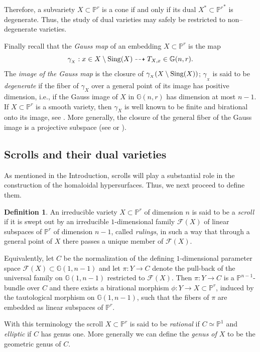 \documentclass[11pt]{article}   %
\theoremstyle{definition}
\newtheorem{Definition}[Theorem]{Definition}
\numberwithin{Theorem}{section} \numberwithin{equation}{section}
\newcommand{\G}{{\mathbb G}}
\newcommand{\p}{{\mathbb P}}
\newcommand{\map}{\dasharrow}
\begin{document}
{Therefore, a subvariety $X\subset \p^ r$ is a cone if and only if
its dual $X^*\subset {\p^ r}^*$ is degenerate. Thus, the study of
dual varieties may safely be restricted to non--degenerate
varieties.



Finally recall that the {\it Gauss map\/} of an embedding $X\subset
\p^r$ is the map
$$\gamma_{_X}: x\in X\setminus {\rm Sing}(X)\map T_{X,x}\in \G(n,r).$$
The {\it image of the Gauss map\/} is the closure of $\gamma_{_X}(
X\setminus {\rm Sing}(X))$;  $\gamma_{_X}$ is said to be {\it
degenerate\/} if the fiber of $\gamma_X$ over a general point of its
image has positive dimension, i.e., if the Gauss image of $X$ in
$\G(n,r)$ has dimension at most $n-1$.  If $X\subset\p^r$ is a
smooth variety, then $\gamma_X$ is well
known to be finite and birational {onto}  its image, see
\cite[Theorem I.2.3]{Zak1}. More generally, the closure of the
general fiber of the Gauss image is a projective subspace (see
\cite[2.10]{GH}  or \cite {Zak1}).

\subsection{Scrolls and their dual varieties}


{ As mentioned in the
Introduction, scrolls  will play a substantial role in the
construction of the homaloidal hypersurfaces. Thus, we next proceed
to define them.}
\medskip

\begin{Definition}\label{scrolldef} An
irreducible variety $X\subset\p^r$ of dimension $n$ is said to be a
{\em scroll} if it is swept out by an irreducible $1$-dimensional family
$\mathcal F(X)$ of linear subspaces of $\p^r$ of dimension $n-1$,
called {\em rulings}, in such a way that
through a general point of $X$ there passes a unique member of
$\mathcal F(X)$.

Equivalently, let
$C$ be  the normalization of the defining $1$-dimensional parameter
space $\mathcal F(X)\subset \mathbb G(1,n-1)$  and let
$\pi:Y\to C$ denote the pull-back of the universal family on
$\mathbb G(1,n-1)$ restricted to $\mathcal F(X)$.
Then  $\pi:Y\to C$ is a $\p^{n-1}$-bundle
over $C$ and there exists a birational morphism $\phi:Y\to
X\subset\p^r$, induced by the tautological morphism on $\mathbb
G(1,n-1)$, such that the fibers of $\pi$ are embedded as linear
subspaces of $\p^r$.

With this terminology the scroll $X\subset\p^r$ is said to be {\em
rational} if $C\simeq\p^1$  and  {\em elliptic} if
$C$  has genus one. More generally we can define the
{\em genus of $X$} to be the geometric genus of $C$.


\end{Definition}}
\end{document}
